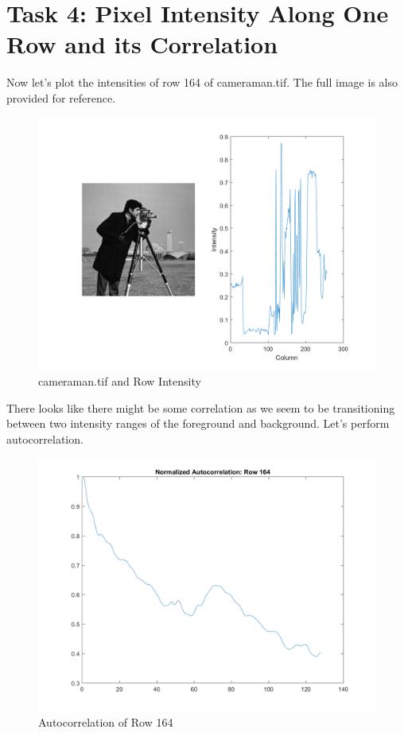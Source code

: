 \section{Task 4: Pixel Intensity Along One Row and its Correlation}

Now let's plot the intensities of row 164 of cameraman.tif. The full image is
also provided for reference.

\begin{figure}[H]
    \centering
    \includegraphics{rowIntensity}
    \caption{cameraman.tif and Row Intensity}
\end{figure}

There looks like there might be some correlation as we seem to be transitioning
between two intensity ranges of the foreground and background. Let's perform
autocorrelation.

\begin{figure}[H]
    \centering
    \includegraphics{autocorrelation}
    \caption{Autocorrelation of Row 164}
\end{figure}

